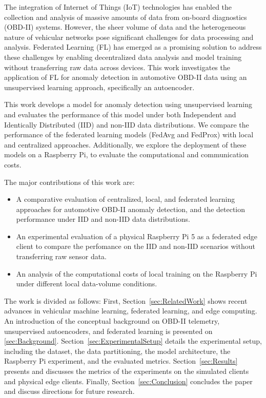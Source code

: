 \documentclass[12pt]{article}
\begin{document}
The integration of Internet of Things (IoT) technologies has enabled the collection and analysis of massive amounts of data from on-board diagnostics (OBD-II) systems. However, the sheer volume of data and the heterogeneous nature of vehicular networks pose significant challenges for data processing and analysis. Federated Learning (FL) has emerged as a promising solution to address these challenges by enabling decentralized data analysis and model training without transferring raw data across devices. This work investigates the application of FL for anomaly detection in automotive OBD-II data using an unsupervised learning approach, specifically an autoencoder.

This work develops a model for anomaly detection using unsupervised learning and evaluates the performance of this model under both Independent and Identically Distributed (IID) and non-IID data distributions. We compare the performance of the federated learning models (FedAvg and FedProx) with local and centralized approaches. Additionally, we explore the deployment of these models on a Raspberry Pi, to evaluate the computational and communication costs.

The major contributions of this work are:
\begin{itemize}
	\item A comparative evaluation of centralized, local, and federated learning approaches for automotive OBD-II anomaly detection, and the detection performance under IID and non-IID data distributions.
	\item An experimental evaluation of a physical Raspberry Pi 5 as a federated edge client to compare the perfomance on the IID and non-IID scenarios without transferring raw sensor data.
	\item An analysis of the computational costs of local training on the Raspberry Pi under different local data-volume conditions.
\end{itemize}


The work is divided as follows: First, Section~\ref{sec:RelatedWork} shows recent advances in vehicular machine learning, federated learning, and edge computing. An introduction of the conceptual background on OBD-II telemetry, unsupervised autoencoders, and federated learning is presented on \ref{sec:Background}. Section~\ref{sec:ExperimentalSetup} details the experimental setup, including the dataset, the data partitioning, the model architecture, the Raspberry Pi experiment, and the evaluated metrics. Section~\ref{sec:Results} presents and discusses the metrics of the experiments on the simulated clients and physical edge clients. Finally, Section~\ref{sec:Conclusion} concludes the paper and discuss directions for future research.
\end{document}
